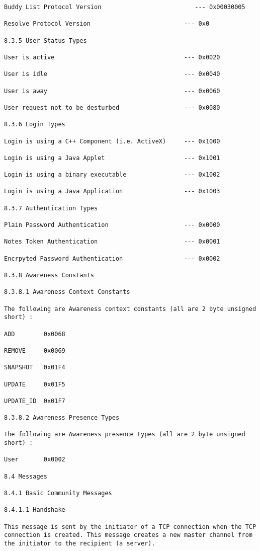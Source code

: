 \documentclass[titlepage,oneside]{book}
\begin{document}
\begin{verbatim}
Buddy List Protocol Version                          --- 0x00030005

Resolve Protocol Version                          --- 0x0

8.3.5 User Status Types

User is active                                    --- 0x0020

User is idle                                      --- 0x0040

User is away                                      --- 0x0060

User request not to be desturbed                  --- 0x0080

8.3.6 Login Types

Login is using a C++ Component (i.e. ActiveX)     --- 0x1000

Login is using a Java Applet                      --- 0x1001

Login is using a binary executable                --- 0x1002

Login is using a Java Application                 --- 0x1003

8.3.7 Authentication Types

Plain Password Authentication                     --- 0x0000

Notes Token Authentication                        --- 0x0001

Encrpyted Password Authentication                 --- 0x0002

8.3.8 Awareness Constants

8.3.8.1 Awareness Context Constants

The following are Awareness context constants (all are 2 byte unsigned
short) :

ADD        0x0068

REMOVE     0x0069

SNAPSHOT   0x01F4

UPDATE     0x01F5

UPDATE_ID  0x01F7

8.3.8.2 Awareness Presence Types

The following are Awareness presence types (all are 2 byte unsigned
short) :

User       0x0002

8.4 Messages

8.4.1 Basic Community Messages

8.4.1.1 Handshake

This message is sent by the initiator of a TCP connection when the TCP
connection is created. This message creates a new master channel from
the initiator to the recipient (a server).


\end{verbatim}
\end{document}
